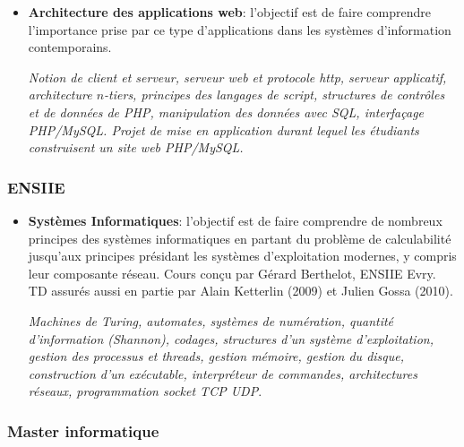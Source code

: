 \documentclass[11pt]{article}
\begin{document}
\begin{itemize}
%
\item \textbf{Architecture des applications web}: l'objectif est de faire comprendre
l'importance prise par ce type d'applications dans les systèmes d'information 
contemporains.  

\textit{Notion de client et serveur, 
serveur web et protocole http, serveur applicatif,
architecture $n$-tiers, principes des langages de script, structures de contrôles et de données de PHP, manipulation
des données avec SQL, interfaçage PHP/MySQL. Projet de mise en application durant lequel les étudiants
construisent un site web PHP/MySQL.}\\


\end{itemize}

\subsubsection*{ENSIIE}

\begin{itemize}
\item \textbf{Systèmes Informatiques}: l'objectif est de faire comprendre de nombreux principes
des systèmes informatiques en partant du problème de calculabilité jusqu'aux principes 
présidant les systèmes d'exploitation modernes, y compris leur composante réseau.
Cours conçu par Gérard Berthelot, ENSIIE Evry. TD assurés aussi en partie par Alain Ketterlin (2009)
et Julien Gossa (2010).

\textit{Machines de Turing, automates, systèmes de numération, 
quantité d'information (Shannon), codages, structures d'un système d'exploitation,
gestion des processus et threads, gestion mémoire, gestion du disque, 
construction d'un exécutable, interpréteur de commandes, architectures réseaux, programmation socket TCP UDP}.
\end{itemize}


\subsubsection*{Master informatique}
\end{document}
